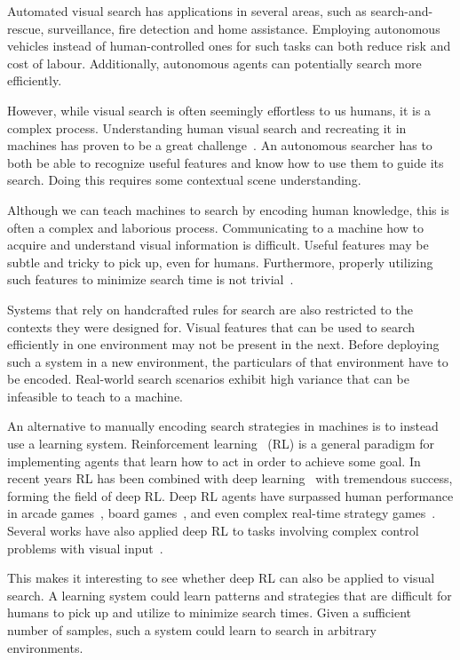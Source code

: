 Automated visual search has applications in several areas, such as search-and-rescue, surveillance, fire detection and home assistance.
Employing autonomous vehicles instead of human-controlled ones for such tasks can both reduce risk and cost of labour.
Additionally, autonomous agents can potentially search more efficiently.

However, while visual search is often seemingly effortless to us humans, it is a complex process.
Understanding human visual search and recreating it in machines has proven to be a great challenge~\cite{eckstein_visual_2011}.
An autonomous searcher has to both be able to recognize useful features and know how to use them to guide its search.
Doing this requires some contextual scene understanding.

Although we can teach machines to search by encoding human knowledge, this is often a complex and laborious process.
Communicating to a machine how to acquire and understand visual information is difficult.
Useful features may be subtle and tricky to pick up, even for humans.
Furthermore, properly utilizing such features to minimize search time is not trivial~\cite{ye_complexity-level_2001,andreopoulos_theory_2009}.

Systems that rely on handcrafted rules for search are also restricted to the contexts they were designed for.
Visual features that can be used to search efficiently in one environment may not be present in the next.
Before deploying such a system in a new environment, the particulars of that environment have to be encoded.
Real-world search scenarios exhibit high variance that can be infeasible to teach to a machine.

An alternative to manually encoding search strategies in machines is to instead use a learning system.
Reinforcement learning~\cite{sutton_reinforcement_2018} (RL) is a general paradigm for implementing agents that learn how to act in order to achieve some goal.
In recent years RL has been combined with deep learning~\cite{goodfellow_deep_2016} with tremendous success, forming the field of deep RL.
Deep RL agents have surpassed human performance in arcade games~\cite{mnih_human-level_2015}, board games~\cite{silver_mastering_2016}, and even complex real-time strategy games~\cite{vinyals_grandmaster_2019}. 
Several works have also applied deep RL to tasks involving complex control problems with visual input~\cite{minut_reinforcement_2001,mnih_recurrent_2014,zhu_target-driven_2017,mirowski_learning_2017}.

This makes it interesting to see whether deep RL can also be applied to visual search.
A learning system could learn patterns and strategies that are difficult for humans to pick up and utilize to minimize search times.
Given a sufficient number of samples, such a system could learn to search in arbitrary environments.

